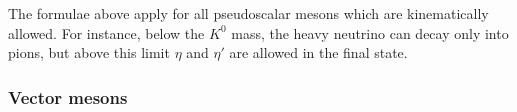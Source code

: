 The formulae above apply for all pseudoscalar mesons which are kinematically allowed.
For instance, below the $K^0$ mass, the heavy neutrino can decay only into pions, %
but above this limit $\eta$ and $\eta'$ are allowed in the final state.
%	

\subsubsection{Vector mesons}
\label{sec:decay_vector}

